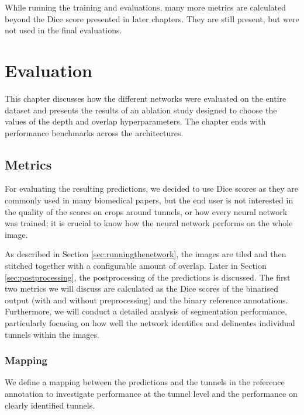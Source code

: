 \documentclass[
  digital,     %
  oneside,     %
  nosansbold,  %
  nocolorbold, %
  lof,         %
  lot,         %
]{fithesis4}
\begin{document}
While running the training and evaluations, many more metrics are calculated beyond the Dice score presented in later chapters. They are still present, but were not used in the final evaluations.

\chapter{Evaluation}
This chapter discusses how the different networks were evaluated on the entire dataset and presents the results of an ablation study designed to choose the values of the depth and overlap hyperparameters. The chapter ends with performance benchmarks across the architectures.

\section{Metrics}
For evaluating the resulting predictions, we decided to use Dice scores as they are commonly used in many biomedical papers, but the end user is not interested in the quality of the scores on crops around tunnels, or how every neural network was trained; it is crucial to know how the neural network performs on the whole image.

As described in Section \ref{sec:runningthenetwork}, the images are tiled and then stitched together with a configurable amount of overlap. Later in Section \ref{sec:postprocessing}, the postprocessing of the predictions is discussed. The first two metrics we will discuss are calculated as the Dice scores of the binarised output (with and without preprocessing) and the binary reference annotations. Furthermore, we will conduct a detailed analysis of segmentation performance, particularly focusing on how well the network identifies and delineates individual tunnels within the images. 

\subsection*{Mapping}
\label{sec:mapping}

We define a mapping between the predictions and the tunnels in the reference annotation to investigate performance at the tunnel level and the performance on clearly identified tunnels.
\end{document}

